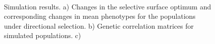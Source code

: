 \begin{refsection}
\begin{figure}[htbp]
    \centering
    \vspace{20pt}
    \\
    \vspace{-18pt}
    \vspace{11pt}
    \caption[Simulation results]{Simulation results. a) Changes in the selective surface optimum and corresponding changes in mean phenotypes for the populations under directional selection. b) Genetic correlation matrices for simulated populations. c) }
    \label{simulated}
\end{figure}


\end{refsection}
